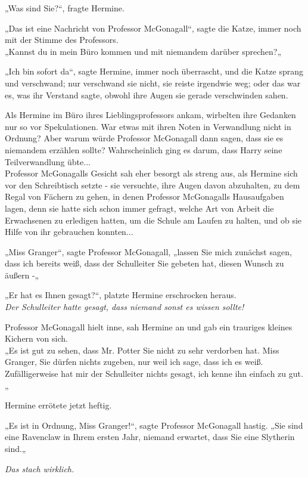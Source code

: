 {„Was sind Sie?“, fragte Hermine.

„Das ist eine Nachricht von Professor McGonagall“, sagte die Katze, immer noch mit der Stimme des Professors.\\ „Kannst du in mein Büro kommen und mit niemandem darüber sprechen?„

„Ich bin sofort da“, sagte Hermine, immer noch überrascht, und die Katze sprang und verschwand; nur verschwand sie nicht, sie reiste irgendwie weg; oder das war es, was ihr Verstand sagte, obwohl ihre Augen sie gerade verschwinden sahen.

Als Hermine im Büro ihres Lieblingsprofessors ankam, wirbelten ihre Gedanken nur so vor Spekulationen. War etwas mit ihren Noten in Verwandlung nicht in Ordnung? Aber warum würde Professor McGonagall dann sagen, dass sie es niemandem erzählen sollte? Wahrscheinlich ging es darum, dass Harry seine Teilverwandlung übte...\\ Professor McGonagalls Gesicht sah eher besorgt als streng aus, als Hermine sich vor den Schreibtisch setzte - sie versuchte, ihre Augen davon abzuhalten, zu dem Regal von Fächern zu gehen, in denen Professor McGonagalls Hausaufgaben lagen, denn sie hatte sich schon immer gefragt, welche Art von Arbeit die Erwachsenen zu erledigen hatten, um die Schule am Laufen zu halten, und ob sie Hilfe von ihr gebrauchen konnten...

„Miss Granger“, sagte Professor McGonagall, „lassen Sie mich zunächst sagen, dass ich bereits weiß, dass der Schulleiter Sie gebeten hat, diesen Wunsch zu äußern -„

„Er hat es Ihnen gesagt?“, platzte Hermine erschrocken heraus.\\ \emph{Der Schulleiter hatte gesagt, dass niemand sonst es wissen sollte!}

Professor McGonagall hielt inne, sah Hermine an und gab ein trauriges kleines Kichern von sich.\\ „Es ist gut zu sehen, dass Mr. Potter Sie nicht zu sehr verdorben hat. Miss Granger, Sie dürfen nichts zugeben, nur weil ich sage, dass ich es weiß. Zufälligerweise hat mir der Schulleiter nichts gesagt, ich kenne ihn einfach zu gut.„

Hermine errötete jetzt heftig.

„Es ist in Ordnung, Miss Granger!“, sagte Professor McGonagall hastig. „Sie sind eine Ravenclaw in Ihrem ersten Jahr, niemand erwartet, dass Sie eine Slytherin sind.„

\emph{Das stach wirklich.}

}
